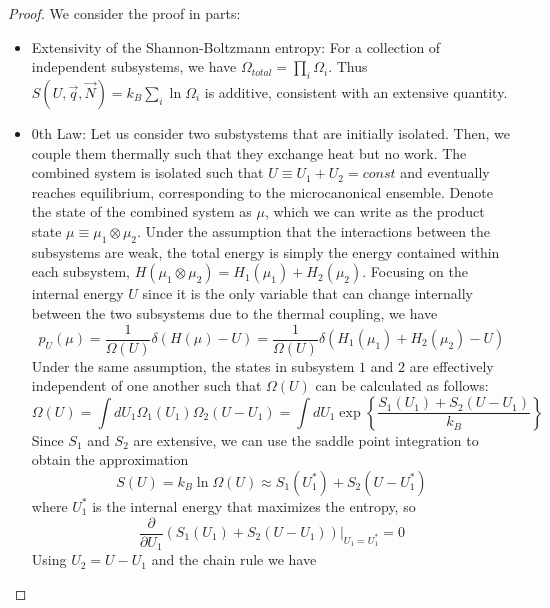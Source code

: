 \documentclass[12pt, a4paper, oneside, openright, titlepage]{book}
\begin{document}
\begin{proof}
    We consider the proof in parts:
    \begin{itemize}
        \item Extensivity of the Shannon-Boltzmann entropy: For a collection of independent subsystems, we have $\Omega_{total} = \prod_i\Omega_i$. Thus $S(U,\vec{q},\vec{N}) = k_B\sum_i\ln\Omega_i$ is additive, consistent with an extensive quantity.
        \item $0$th Law: Let us consider two substystems that are initially isolated. Then, we couple them thermally such that they exchange heat but no work. The combined system is isolated such that $U \equiv U_1+U_2 = const$ and eventually reaches equilibrium, corresponding to the microcanonical ensemble. Denote the state of the combined system as $\mu$, which we can write as the product state $\mu \equiv \mu_1\otimes \mu_2$. Under the assumption that the interactions between the subsystems are weak, the total energy is simply the energy contained within each subsystem, $H(\mu_1\otimes \mu_2) = H_1(\mu_1) + H_2(\mu_2)$. Focusing on the internal energy $U$ since it is the only variable that can change internally between the two subsystems due to the thermal coupling, we have \begin{equation*}
                p_U(\mu) = \frac{1}{\Omega(U)}\delta(H(\mu) - U) = \frac{1}{\Omega(U)}\delta(H_1(\mu_1)+H_2(\mu_2) - U)
        \end{equation*}
            Under the same assumption, the states in subsystem $1$ and $2$ are effectively independent of one another such that $\Omega(U)$ can be calculated as follows: \begin{equation*}
                \Omega(U) = \int dU_1\Omega_1(U_1)\Omega_2(U-U_1) = \int dU_1\exp\left\{\frac{S_1(U_1) + S_2(U-U_1)}{k_B}\right\}
            \end{equation*}
            Since $S_1$ and $S_2$ are extensive, we can use the saddle point integration to obtain the approximation \begin{equation*}
                S(U) = k_B\ln\Omega(U) \approx S_1(U_1^*) + S_2(U-U_1^*)
            \end{equation*}
            where $U_1^*$ is the internal energy that maximizes the entropy, so \begin{equation*}
                \frac{\partial}{\partial U_1}(S_1(U_1) + S_2(U-U_1))\Big\rvert_{U_1 = U_1^*} = 0
            \end{equation*}
            Using $U_2 = U-U_1$ and the chain rule we have \begin{equation*}

\end{equation*}
\end{itemize}
\end{proof}
\end{document}
